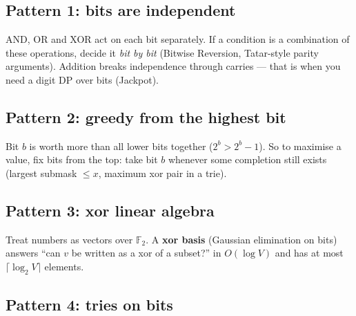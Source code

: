 \subsection*{Pattern 1: bits are independent}

AND, OR and XOR act on each bit separately. If a condition is a combination
of these operations, decide it \emph{bit by bit} (Bitwise Reversion,
Tatar-style parity arguments). Addition breaks independence through carries
--- that is when you need a digit DP over bits (Jackpot).

\subsection*{Pattern 2: greedy from the highest bit}

Bit $b$ is worth more than all lower bits together ($2^b>2^b-1$). So to
maximise a value, fix bits from the top: take bit $b$ whenever some completion
still exists (largest submask $\le x$, maximum xor pair in a trie).

\subsection*{Pattern 3: xor linear algebra}

Treat numbers as vectors over $\mathbb{F}_2$. A \textbf{xor basis} (Gaussian
elimination on bits) answers ``can $v$ be written as a xor of a subset?'' in
$O(\log V)$ and has at most $\lceil\log_2 V\rceil$ elements.

\begin{center}
\end{center}

\subsection*{Pattern 4: tries on bits}

